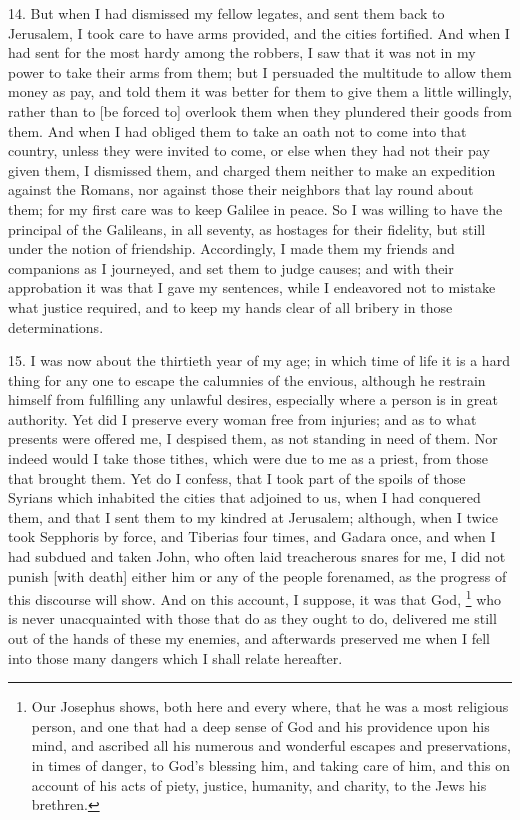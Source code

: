 14. But when I had dismissed my fellow legates, and sent them back to
Jerusalem, I took care to have arms provided, and the cities fortified.
And when I had sent for the most hardy among the robbers, I saw that it
was not in my power to take their arms from them; but I persuaded the
multitude to allow them money as pay, and told them it was better for them
to give them a little willingly, rather than to [be forced to] overlook
them when they plundered their goods from them. And when I had obliged
them to take an oath not to come into that country, unless they were
invited to come, or else when they had not their pay given them, I
dismissed them, and charged them neither to make an expedition against the
Romans, nor against those their neighbors that lay round about them; for
my first care was to keep Galilee in peace. So I was willing to have the
principal of the Galileans, in all seventy, as hostages for their
fidelity, but still under the notion of friendship. Accordingly, I made
them my friends and companions as I journeyed, and set them to judge
causes; and with their approbation it was that I gave my sentences, while
I endeavored not to mistake what justice required, and to keep my hands
clear of all bribery in those determinations.

15. I was now about the thirtieth year of my age; in which time of life it
is a hard thing for any one to escape the calumnies of the envious,
although he restrain himself from fulfilling any unlawful desires,
especially where a person is in great authority. Yet did I preserve every
woman free from injuries; and as to what presents were offered me, I
despised them, as not standing in need of them. Nor indeed would I take
those tithes, which were due to me as a priest, from those that brought
them. Yet do I confess, that I took part of the spoils of those Syrians
which inhabited the cities that adjoined to us, when I had conquered them,
and that I sent them to my kindred at Jerusalem; although, when I twice
took Sepphoris by force, and Tiberias four times, and Gadara once, and
when I had subdued and taken John, who often laid treacherous snares for
me, I did not punish [with death] either him or any of the people
forenamed, as the progress of this discourse will show. And on this
account, I suppose, it was that God, \footnote{Our Josephus shows, both
here and every where, that he was a most religious person, and one that
had a deep sense of God and his providence upon his mind, and ascribed all
his numerous and wonderful escapes and preservations, in times of danger,
to God's blessing him, and taking care of him, and this on account of his
acts of piety, justice, humanity, and charity, to the Jews his brethren.} who is
never unacquainted with those that do as they ought to do, delivered me
still out of the hands of these my enemies, and afterwards preserved me
when I fell into those many dangers which I shall relate hereafter.

